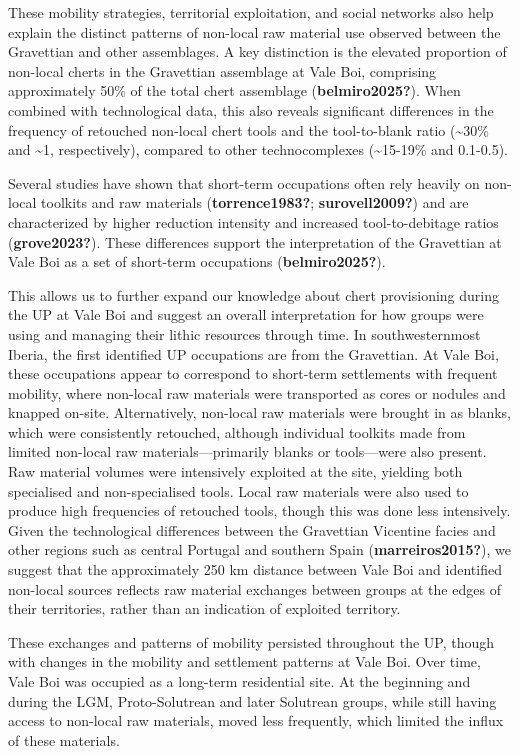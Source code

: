 \documentclass[
  a4paper,
  DIV=11,
  numbers=noendperiod]{scrreprt}
\begin{document}
These mobility strategies, territorial exploitation, and social networks
also help explain the distinct patterns of non-local raw material use
observed between the Gravettian and other assemblages. A key distinction
is the elevated proportion of non-local cherts in the Gravettian
assemblage at Vale Boi, comprising approximately 50\% of the total chert
assemblage (\textbf{belmiro2025?}). When combined with technological
data, this also reveals significant differences in the frequency of
retouched non-local chert tools and the tool-to-blank ratio
(\textasciitilde30\% and \textasciitilde1, respectively), compared to
other technocomplexes (\textasciitilde15-19\% and 0.1-0.5).

Several studies have shown that short-term occupations often rely
heavily on non-local toolkits and raw materials (\textbf{torrence1983?};
\textbf{surovell2009?}) and are characterized by higher reduction
intensity and increased tool-to-debitage ratios (\textbf{grove2023?}).
These differences support the interpretation of the Gravettian at Vale
Boi as a set of short-term occupations (\textbf{belmiro2025?}).

This allows us to further expand our knowledge about chert provisioning
during the UP at Vale Boi and suggest an overall interpretation for how
groups were using and managing their lithic resources through time. In
southwesternmost Iberia, the first identified UP occupations are from
the Gravettian. At Vale Boi, these occupations appear to correspond to
short-term settlements with frequent mobility, where non-local raw
materials were transported as cores or nodules and knapped on-site.
Alternatively, non-local raw materials were brought in as blanks, which
were consistently retouched, although individual toolkits made from
limited non-local raw materials---primarily blanks or tools---were also
present. Raw material volumes were intensively exploited at the site,
yielding both specialised and non-specialised tools. Local raw materials
were also used to produce high frequencies of retouched tools, though
this was done less intensively. Given the technological differences
between the Gravettian Vicentine facies and other regions such as
central Portugal and southern Spain (\textbf{marreiros2015?}), we
suggest that the approximately 250 km distance between Vale Boi and
identified non-local sources reflects raw material exchanges between
groups at the edges of their territories, rather than an indication of
exploited territory.

These exchanges and patterns of mobility persisted throughout the UP,
though with changes in the mobility and settlement patterns at Vale Boi.
Over time, Vale Boi was occupied as a long-term residential site. At the
beginning and during the LGM, Proto-Solutrean and later Solutrean
groups, while still having access to non-local raw materials, moved less
frequently, which limited the influx of these materials.
\end{document}
